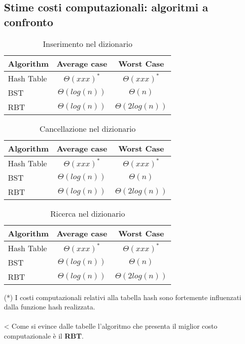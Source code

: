 \documentclass[paper=a4, fontsize=11pt,twoside]{scrartcl}   %
\begin{document}
			\subsection{Stime costi computazionali: algoritmi a confronto}				
				\begin{table}[ht]	
					\centering									
					\begin{tabular}{l | c | c}						
						Algorithm & Average case & Worst Case \\
						\hline
						Hash Table & $\Theta(xxx)^*$ & $\Theta(xxx)^*$ \\
						\hline
						BST & $\Theta(log(n))$ & $\Theta(n)$ \\
						\hline
						RBT & $\Theta(log(n))$ & $\Theta(2log(n))$ \\
						\hline					
					\end{tabular}
					\caption{Inserimento nel dizionario} %
				\end{table}					
				\begin{table}[ht]
					\centering									
					\begin{tabular}{l | c | c}
						
						Algorithm & Average case & Worst Case \\
						\hline
						Hash Table & $\Theta(xxx)^*$ & $\Theta(xxx)^*$ \\
						\hline
						BST & $\Theta(log(n))$ & $\Theta(n)$ \\
						\hline
						RBT & $\Theta(log(n))$ & $\Theta(2log(n))$ \\
						\hline					
					\end{tabular}
					\caption{Cancellazione nel dizionario} %
				\end{table}				
				\begin{table}[ht]
					\centering									
					\begin{tabular}{l | c | c}
						
						Algorithm & Average case & Worst Case \\
						\hline
						Hash Table & $\Theta(xxx)^*$ & $\Theta(xxx)^*$ \\
						\hline
						BST & $\Theta(log(n))$ & $\Theta(n)$ \\
						\hline
						RBT & $\Theta(log(n))$ & $\Theta(2log(n))$ \\
						\hline					
					\end{tabular}
					\caption{Ricerca nel dizionario} %
				\end{table}
			 {\fontsize{2.5mm}{1.5mm}\selectfont(*) I costi computazionali relativi alla tabella hash sono fortemente influenzati dalla funzione hash realizzata.\\}\\<
			 \noindent Come si evince dalle tabelle l'algoritmo che presenta il miglior costo computazionale è il \textbf{RBT}.
			 \pagebreak
			 
\end{document}
